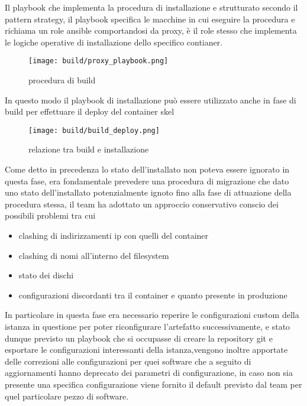 Il playbook che implementa la procedura di installazione e strutturato secondo il pattern strategy, il playbook specifica le macchine in cui eseguire la procedura e richiama un role ansible comportandosi da proxy, è il role stesso che implementa le logiche operative di installazione dello specifico contianer.

\begin{figure}[H]
    \centering
    \texttt{[image: build/proxy\_playbook.png]}
    \caption{procedura di build}
    \label{fig:enter-label}
\end{figure}

In questo modo il playbook di installazione può essere utilizzato anche in fase di build per effettuare il deploy del container skel

\begin{figure}[H]
    \centering
    \texttt{[image: build/build\_deploy.png]}
    \caption{relazione tra build e installazione}
    \label{fig:enter-label}
\end{figure}

Come detto in precedenza lo stato dell'installato non poteva essere ignorato in questa fase, era fondamentale prevedere una procedura di migrazione che dato uno stato dell'installato potenzialmente ignoto fino alla fase di attuazione della procedura stessa, il team ha adottato un approccio conservativo conscio dei possibili problemi tra cui

\begin{itemize}
  \item{clashing di indirizzamenti ip con quelli del container}
  \item{clashing di nomi all'interno del filesystem}
  \item{stato dei dischi}
  \item{configurazioni discordanti tra il container e quanto presente in produzione}
\end{itemize}

In particolare in questa fase era necessario reperire le configurazioni custom della istanza in questione per poter riconfigurare l'artefatto successivamente, e stato dunque previsto un playbook che si occupasse di creare la repository git e esportare le configurazioni interessanti della istanza,vengono inoltre apportate delle correzioni alle configurazioni per quei software che a seguito di aggiornamenti hanno deprecato dei parametri di configurazione, in caso non sia presente una specifica configurazione viene fornito il default previsto dal team per quel particolare pezzo di software.

